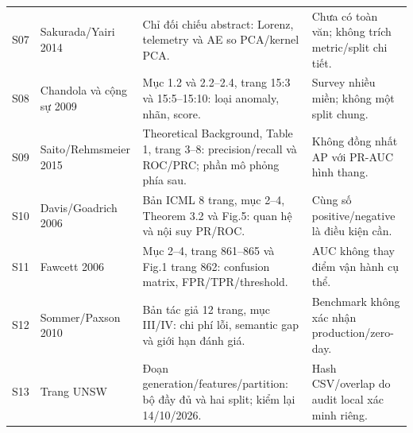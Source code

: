 \documentclass[12pt,a4paper,oneside]{report}
\begin{document}
\begin{longtable}{L{1.0cm}L{3.4cm}L{6.6cm}L{4.6cm}}
S07 & Sakurada/Yairi 2014 \cite{sakurada2014} & Chỉ đối chiếu abstract: Lorenz, telemetry và AE so PCA/kernel PCA. & Chưa có toàn văn; không trích metric/split chi tiết.\\
S08 & Chandola và cộng sự 2009 \cite{chandola2009} & Mục 1.2 và 2.2--2.4, trang 15:3 và 15:5--15:10: loại anomaly, nhãn, score. & Survey nhiều miền; không một split chung.\\
S09 & Saito/Rehmsmeier 2015 \cite{saito2015} & Theoretical Background, Table 1, trang 3--8: precision/recall và ROC/PRC; phần mô phỏng phía sau. & Không đồng nhất AP với PR-AUC hình thang.\\
S10 & Davis/Goadrich 2006 \cite{davis2006} & Bản ICML 8 trang, mục 2--4, Theorem 3.2 và Fig.5: quan hệ và nội suy PR/ROC. & Cùng số positive/negative là điều kiện cần.\\
S11 & Fawcett 2006 \cite{fawcett2006} & Mục 2--4, trang 861--865 và Fig.1 trang 862: confusion matrix, FPR/TPR/threshold. & AUC không thay điểm vận hành cụ thể.\\
S12 & Sommer/Paxson 2010 \cite{sommer2010} & Bản tác giả 12 trang, mục III/IV: chi phí lỗi, semantic gap và giới hạn đánh giá. & Benchmark không xác nhận production/zero-day.\\
S13 & Trang UNSW \cite{unswsite} & Đoạn generation/features/partition: bộ đầy đủ và hai split; kiểm lại 14/10/2026. & Hash CSV/overlap do audit local xác minh riêng.\\
\bottomrule\end{longtable}\endgroup
\end{document}
